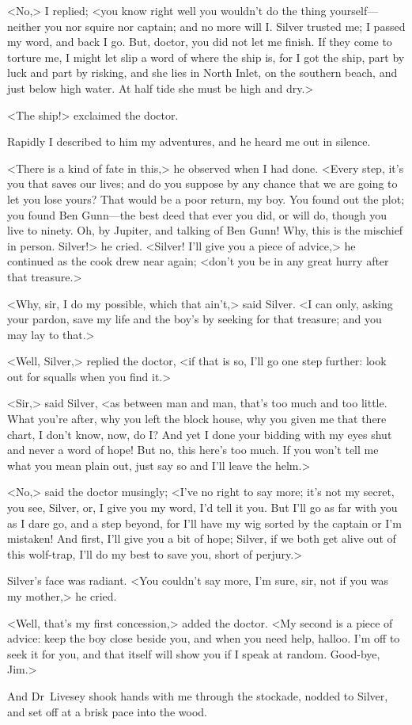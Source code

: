 <No,> I replied; <you know right well you wouldn't do the thing yourself—neither you nor squire nor captain; and no more will I\@. Silver trusted me; I passed my word, and back I go. But, doctor, you did not let me finish. If they come to torture me, I might let slip a word of where the ship is, for I got the ship, part by luck and part by risking, and she lies in North Inlet, on the southern beach, and just below high water. At half tide she must be high and dry.>

<The ship!> exclaimed the doctor.

Rapidly I described to him my adventures, and he heard me out in silence.

<There is a kind of fate in this,> he observed when I had done. <Every step, it's you that saves our lives; and do you suppose by any chance that we are going to let you lose yours? That would be a poor return, my boy. You found out the plot; you found Ben Gunn—the best deed that ever you did, or will do, though you live to ninety. Oh, by Jupiter, and talking of Ben Gunn! Why, this is the mischief in person. Silver!> he cried. <Silver! I'll give you a piece of advice,> he continued as the cook drew near again; <don't you be in any great hurry after that treasure.>

<Why, sir, I do my possible, which that ain't,> said Silver. <I can only, asking your pardon, save my life and the boy's by seeking for that treasure; and you may lay to that.>

<Well, Silver,> replied the doctor, <if that is so, I'll go one step further: look out for squalls when you find it.>

<Sir,> said Silver, <as between man and man, that's too much and too little. What you're after, why you left the block house, why you given me that there chart, I don't know, now, do I\@? And yet I done your bidding with my eyes shut and never a word of hope! But no, this here's too much. If you won't tell me what you mean plain out, just say so and I'll leave the helm.>

<No,> said the doctor musingly; <I've no right to say more; it's not my secret, you see, Silver, or, I give you my word, I'd tell it you. But I'll go as far with you as I dare go, and a step beyond, for I'll have my wig sorted by the captain or I'm mistaken! And first, I'll give you a bit of hope; Silver, if we both get alive out of this wolf-trap, I'll do my best to save you, short of perjury.>

Silver's face was radiant. <You couldn't say more, I'm sure, sir, not if you was my mother,> he cried.

<Well, that's my first concession,> added the doctor. <My second is a piece of advice: keep the boy close beside you, and when you need help, halloo. I'm off to seek it for you, and that itself will show you if I speak at random. Good-bye, Jim.>

And Dr~Livesey shook hands with me through the stockade, nodded to Silver, and set off at a brisk pace into the wood.